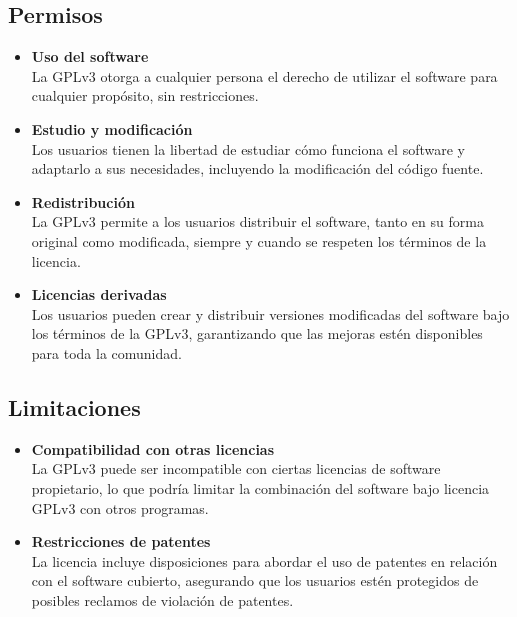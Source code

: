 \subsection{Permisos}
\begin{itemize}
  \item \textbf{Uso del software} \\
  La GPLv3 otorga a cualquier persona el derecho de utilizar el software para cualquier propósito, sin restricciones.
  \item \textbf{Estudio y modificación} \\
  Los usuarios tienen la libertad de estudiar cómo funciona el software y adaptarlo a sus necesidades, incluyendo la modificación del código fuente.
  \item \textbf{Redistribución} \\
  La GPLv3 permite a los usuarios distribuir el software, tanto en su forma original como modificada, siempre y cuando se respeten los términos de la licencia.
  \item \textbf{Licencias derivadas} \\
  Los usuarios pueden crear y distribuir versiones modificadas del software bajo los términos de la GPLv3, garantizando que las mejoras estén disponibles para toda la comunidad.
\end{itemize}

\subsection{Limitaciones}
\begin{itemize}
  \item \textbf{Compatibilidad con otras licencias} \\
  La GPLv3 puede ser incompatible con ciertas licencias de software propietario, lo que podría limitar la combinación del software bajo licencia GPLv3 con otros programas.
  \item \textbf{Restricciones de patentes} \\
  La licencia incluye disposiciones para abordar el uso de patentes en relación con el software cubierto, asegurando que los usuarios estén protegidos de posibles reclamos de violación de patentes.
\end{itemize}

